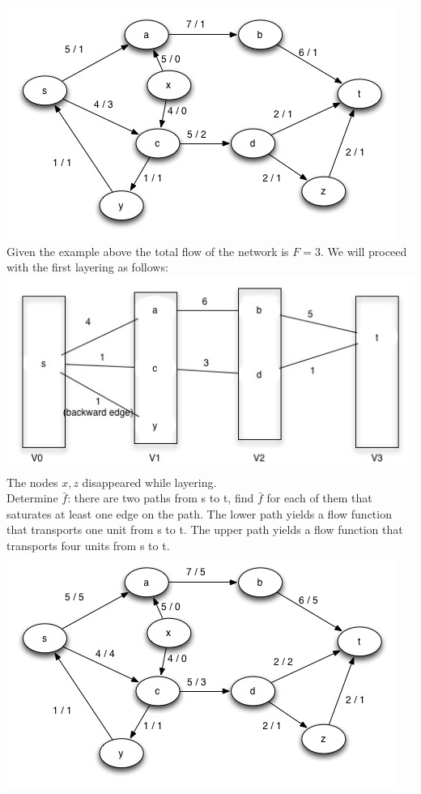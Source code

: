 \begin{example}
\includegraphics{diagrams/Chapter3_Example6_V1.jpg} \\
Given the example above the total flow of the network is $F=3$. We will proceed with the first layering as follows: \\
\includegraphics{diagrams/Chapter3_Example_6_Layering1.jpg} \\ 
The nodes $x, z$ disappeared while layering. \\
Determine $\bar{f}$: there are two paths from s to t, find $\bar{f}$ for each of them that saturates at least one edge on the path. The lower path yields a flow function that transports one unit from s to t. The upper path yields a flow function that transports four units from s to t. \\
\includegraphics{diagrams/Chapter3_Example6_V2.jpg} \\

\end{example}
